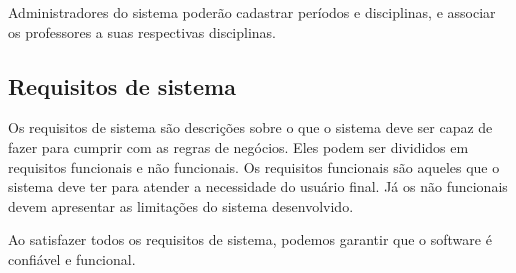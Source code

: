 Administradores do sistema poderão cadastrar períodos e disciplinas, e associar os professores a suas respectivas disciplinas. 

\subsection{Requisitos de sistema}
Os requisitos de sistema são descrições sobre o que o sistema deve ser capaz de fazer para cumprir com as regras de negócios. Eles podem ser divididos em requisitos funcionais e não funcionais. Os requisitos funcionais são aqueles que o sistema deve ter para atender a necessidade do usuário final. Já os não funcionais devem apresentar as limitações do sistema desenvolvido.

Ao satisfazer todos os requisitos de sistema, podemos garantir que o software é confiável e funcional. 

